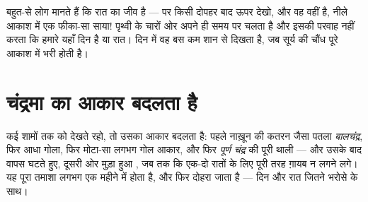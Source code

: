 \begin{remark}[दिन का चंद्रमा]\label{rem:g2:moon-in-the-sky:daytime}
बहुत-से लोग मानते हैं कि  रात का जीव है --- पर किसी दोपहर बाद
ऊपर देखो, और वह वहीं है, नीले आकाश में एक फीका-सा साया! 
पृथ्वी के चारों ओर अपने ही समय पर चलता है और इसकी परवाह नहीं करता कि
हमारे यहाँ दिन है या रात। दिन में वह बस कम शान से दिखता है, जब सूर्य
की चौंध पूरे आकाश में भरी होती है।
\end{remark}

\section{चंद्रमा का आकार बदलता है}

\begin{example}[चंद्रमा के बदलते आकार]\label{ex:g2:moon-in-the-sky:shapes}
कई शामों तक  को देखते रहो, तो उसका आकार बदलता है: पहले नाख़ून
की कतरन जैसा पतला \emph{बालचंद्र}, फिर आधा गोला, फिर
मोटा-सा लगभग गोल आकार, और फिर \emph{पूर्ण चंद्र}
की पूरी थाली --- और उसके बाद वापस घटते हुए, दूसरी ओर मुड़ा हुआ
, जब तक कि एक-दो रातों के लिए  पूरी तरह ग़ायब न लगने
लगे। यह पूरा तमाशा लगभग एक महीने में होता है, और फिर दोहरा जाता है ---
दिन और रात जितने भरोसे के साथ।
\end{example}

